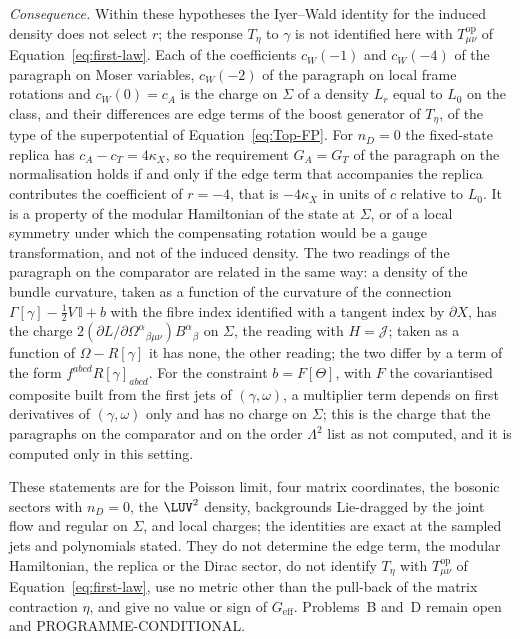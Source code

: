 \emph{Consequence.} Within these hypotheses the Iyer--Wald identity for the induced density does not select \(r\); the response \(T_\eta\) to \(\gamma\) is not identified here with \(T^{\mathrm{op}}_{\mu\nu}\) of Equation~\eqref{eq:first-law}. Each of the coefficients \(c_W(-1)\) and \(c_W(-4)\) of the paragraph on Moser variables, \(c_W(-2)\) of the paragraph on local frame rotations and \(c_W(0)=c_A\) is the charge on \(\Sigma\) of a density \(L_r\) equal to \(L_0\) on the class, and their differences are edge terms of the boost generator of \(T_\eta\), of the type of the superpotential of Equation~\eqref{eq:Top-FP}. For \(n_D=0\) the fixed-state replica has \(c_A-c_T=4\kappa_X\), so the requirement \(G_A=G_T\) of the paragraph on the normalisation holds if and only if the edge term that accompanies the replica contributes the coefficient of \(r=-4\), that is \(-4\kappa_X\) in units of \(c\) relative to \(L_0\). It is a property of the modular Hamiltonian of the state at \(\Sigma\), or of a local symmetry under which the compensating rotation would be a gauge transformation, and not of the induced density. The two readings of the paragraph on the comparator are related in the same way: a density of the bundle curvature, taken as a function of the curvature of the connection \(\Gamma[\gamma]-\tfrac12V\,\mathbb I+b\) with the fibre index identified with a tangent index by \(\partial X\), has the charge \(2(\partial L/\partial\Omega^\alpha{}_{\beta\mu\nu})B^\alpha{}_\beta\) on \(\Sigma\), the reading with \(H=\mathcal J\); taken as a function of \(\Omega-R[\gamma]\) it has none, the other reading; the two differ by a term of the form \(f^{abcd}R[\gamma]_{abcd}\). For the constraint \(b=F[\Theta]\), with \(F\) the covariantised composite built from the first jets of \((\gamma,\omega)\), a multiplier term depends on first derivatives of \((\gamma,\omega)\) only and has no charge on \(\Sigma\); this is the charge that the paragraphs on the comparator and on the order \(\Lambda^2\) list as not computed, and it is computed only in this setting.

These statements are for the Poisson limit, four matrix coordinates, the bosonic sectors with \(n_D=0\), the \(\LUV^2\) density, backgrounds Lie-dragged by the joint flow and regular on \(\Sigma\), and local charges; the identities are exact at the sampled jets and polynomials stated. They do not determine the edge term, the modular Hamiltonian, the replica or the Dirac sector, do not identify \(T_\eta\) with \(T^{\mathrm{op}}_{\mu\nu}\) of Equation~\eqref{eq:first-law}, use no metric other than the pull-back of the matrix contraction \(\eta\), and give no value or sign of \(G_{\mathrm{eff}}\). Problems~B and~D remain open and PROGRAMME-CONDITIONAL.

